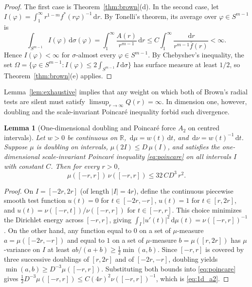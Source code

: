 \documentclass[a4paper,11pt,noarxiv]{quantumarticle}
\newcommand{\R}{\mathbb{R}}
\newcommand{\abs}[1]{\lvert #1\rvert}
\newcommand{\dd}{\,\mathrm{d}}
\newcommand{\fbar}{\bar f}
\theoremstyle{plain}
\newtheorem{lemma}[theorem]{Lemma}
\theoremstyle{definition}
\theoremstyle{remark}
\begin{document}
\begin{proof}
The first case is Theorem~\ref{thm:brown}(d). In the second case, let
$I(\varphi)=\int_1^\infty r^{1-m}f^*(r\varphi)^{-1}\dd r$. By Tonelli's
theorem, its average over $\varphi\in S^{m-1}$ is
\[
\int_{S^{m-1}}I(\varphi)\dd\sigma(\varphi)
=\int_1^\infty\frac{A(r)}{r^{m-1}}\dd r
\le C\int_1^\infty\frac{\dd r}{r^{m-1}\fbar(r)}<\infty.
\]
Hence $I(\varphi)<\infty$ for $\sigma$-almost every $\varphi\in S^{m-1}$.
By Chebyshev's inequality, the set $\Omega=\{\varphi\in S^{m-1}:
I(\varphi)\le 2\int_{S^{m-1}}I\dd\sigma\}$ has surface measure at least
$1/2$, so Theorem~\ref{thm:brown}(e) applies.
\end{proof}

Lemma~\ref{lem:exhaustive} implies that any weight on which both of
Brown's radial tests are silent must satisfy $\limsup_{r\to\infty}Q(r)=\infty$.
In dimension one, however, doubling and the scale-invariant Poincar\'e
inequality forbid such divergence.

\begin{lemma}[One-dimensional doubling and Poincar\'e force $A_2$ on
centred intervals]\label{lem:1d_a2}
Let $w>0$ be continuous on $\R$, $\dd\mu=w(t)\dd t$, and
$\dd\nu=w(t)^{-1}\dd t$. Suppose $\mu$ is doubling on intervals,
$\mu(2I)\le D\,\mu(I)$, and satisfies the one-dimensional
scale-invariant Poincar\'e inequality \eqref{eq:poincare} on all
intervals $I$ with constant $C$. Then for every $r>0$,
\begin{equation}\label{eq:1d_a2}
\mu([-r,r])\,\nu([-r,r])\le 32\,CD^3\,r^2.
\end{equation}
\end{lemma}

\begin{proof}
On $I=[-2r,2r]$ (of length $\abs{I}=4r$), define the continuous piecewise
smooth test function $u(t)=0$ for $t\in[-2r,-r]$, $u(t)=1$ for
$t\in[r,2r]$, and $u(t)=\nu([-r,t])/\nu([-r,r])$ for $t\in[-r,r]$. This
choice minimizes the Dirichlet energy across $[-r,r]$, giving
$\int_I\abs{u'(t)}^2\dd\mu(t)=\nu([-r,r])^{-1}$. On the other hand, any
function equal to $0$ on a set of $\mu$-measure $a=\mu([-2r,-r])$ and
equal to $1$ on a set of $\mu$-measure $b=\mu([r,2r])$ has $\mu$-variance
on $I$ at least $ab/(a+b)\ge\tfrac12\min(a,b)$. Since $[-r,r]$ is
covered by three successive doublings of $[r,2r]$ and of $[-2r,-r]$,
doubling yields $\min(a,b)\ge D^{-3}\mu([-r,r])$. Substituting both
bounds into \eqref{eq:poincare} gives
$\tfrac12 D^{-3}\mu([-r,r])\le C(4r)^2\nu([-r,r])^{-1}$, which is
\eqref{eq:1d_a2}.
\end{proof}
\end{document}
